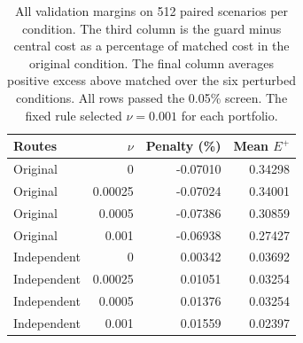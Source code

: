 \begin{table}[t]
\centering
\caption{All validation margins on 512 paired scenarios per condition. The third column is the guard minus central cost as a percentage of matched cost in the original condition. The final column averages positive excess above matched over the six perturbed conditions. All rows passed the 0.05\% screen. The fixed rule selected $\nu=0.001$ for each portfolio.}
\label{tab:guarded-validation}
\footnotesize\setlength{\tabcolsep}{3pt}\renewcommand{\arraystretch}{1.12}
\begin{tabular}{@{}lrrr@{}}
\toprule
Routes & $\nu$ & Penalty (\%) & Mean $E^+$ \\
\midrule
Original & 0 & -0.07010 & 0.34298 \\
Original & 0.00025 & -0.07024 & 0.34001 \\
Original & 0.0005 & -0.07386 & 0.30859 \\
Original & 0.001 & -0.06938 & 0.27427 \\
Independent & 0 & 0.00342 & 0.03692 \\
Independent & 0.00025 & 0.01051 & 0.03254 \\
Independent & 0.0005 & 0.01376 & 0.03254 \\
Independent & 0.001 & 0.01559 & 0.02397 \\
\bottomrule
\end{tabular}
\end{table}
